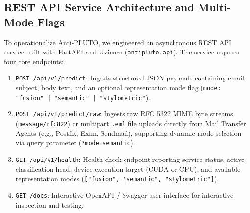 \documentclass[journal]{IEEEtran}
\begin{document}
\subsection{REST API Service Architecture and Multi-Mode Flags}
To operationalize Anti-PLUTO, we engineered an asynchronous REST API service built with FastAPI and Uvicorn (\texttt{antipluto.api}). The service exposes four core endpoints:
\begin{enumerate}
    \item \texttt{POST /api/v1/predict}: Ingests structured JSON payloads containing email subject, body text, and an optional representation mode flag (\texttt{mode: "fusion" | "semantic" | "stylometric"}).
    \item \texttt{POST /api/v1/predict/raw}: Ingests raw RFC 5322 MIME byte streams (\texttt{message/rfc822}) or multipart \texttt{.eml} file uploads directly from Mail Transfer Agents (e.g., Postfix, Exim, Sendmail), supporting dynamic mode selection via query parameter (\texttt{?mode=semantic}).
    \item \texttt{GET /api/v1/health}: Health-check endpoint reporting service status, active classification head, device execution target (CUDA or CPU), and available representation modes (\texttt{["fusion", "semantic", "stylometric"]}).
    \item \texttt{GET /docs}: Interactive OpenAPI / Swagger user interface for interactive inspection and testing.
\end{enumerate}
\end{document}
